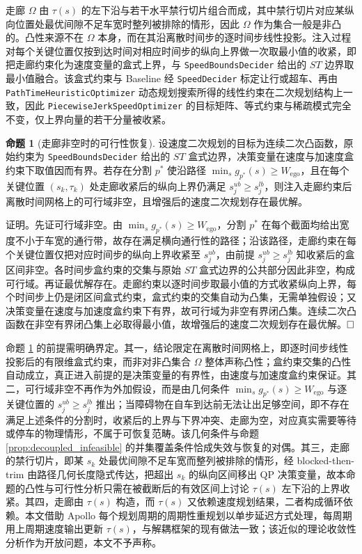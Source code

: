 \documentclass[a4paper,11pt]{ctexart}
\theoremstyle{definition}
\newtheorem{proposition}{命题}[section]
\begin{document}
走廊 $\Omega$ 由 $\tau(s)$ 的左下沿与若干水平禁行切片组合而成，其中禁行切片对应某纵向位置处最优间隙不足车宽时整列被排除的情形，因此 $\Omega$ 作为集合一般是非凸的。凸性来源不在 $\Omega$ 本身，而在其沿离散时间步的逐时间步线性投影。注入过程对每个关键位置仅按到达时间对相应时间步的纵向上界做一次取最小值的收紧，即把走廊约束化为速度变量的盒式上界，与 \texttt{SpeedBoundsDecider} 给出的 $ST$ 边界取最小值融合。该盒式约束与 Baseline 经 \texttt{SpeedDecider} 标定让行或超车、再由 \texttt{PathTimeHeuristicOptimizer} 动态规划搜索所得的线性约束在二次规划结构上一致，因此 \texttt{PiecewiseJerkSpeedOptimizer} 的目标矩阵、等式约束与稀疏模式完全不变，仅上界向量的若干分量被收紧。

\begin{proposition}[走廊非空时的可行性恢复]
\label{prop:feasibility_recovery}
设速度二次规划的目标为连续二次凸函数，原始约束为 \texttt{SpeedBoundsDecider} 给出的 $ST$ 盒式边界，决策变量在速度与加速度盒约束下取值因而有界。若存在分割 $p^{*}$ 使沿路径 $\min_s g_{p^{*}}(s) \geq W_{\text{ego}}$，且在每个关键位置 $(s_k, \tau_k)$ 处走廊收紧后的纵向上界仍满足 $s_j^{ub} \geq s_j^{lb}$，则注入走廊约束后离散时间网格上的可行域非空，且增强后的速度二次规划存在最优解。
\end{proposition}

证明。先证可行域非空。由 $\min_s g_{p^{*}}(s) \geq W_{\text{ego}}$，分割 $p^{*}$ 在每个截面均给出宽度不小于车宽的通行带，故存在满足横向通行性的路径；沿该路径，走廊约束在每个关键位置仅把对应时间步的纵向上界收紧至 $s_j^{ub}$，由前提 $s_j^{ub} \geq s_j^{lb}$ 知收紧后的盒区间非空。各时间步盒约束的交集与原始 $ST$ 盒式边界的公共部分因此非空，构成可行域。再证最优解存在。走廊约束以逐时间步取最小值的方式收紧纵向上界，每个时间步上仍是闭区间盒式约束，盒式约束的交集自动为凸集，无需单独假设；又决策变量在速度与加速度盒约束下有界，故可行域为非空有界闭凸集。连续二次凸函数在非空有界闭凸集上必取得最小值，故增强后的速度二次规划存在最优解。$\hfill\Box$

命题 \ref{prop:feasibility_recovery} 的前提需明确界定。其一，结论限定在离散时间网格上，即逐时间步线性投影后的有限维盒式约束，而非对非凸集合 $\Omega$ 整体声称凸性；盒约束交集的凸性自动成立，真正进入前提的是决策变量的有界性，由速度与加速度盒约束保证。其二，可行域非空不再作为外加假设，而是由几何条件 $\min_s g_{p^{*}}(s) \geq W_{\text{ego}}$ 与逐关键位置的 $s_j^{ub} \geq s_j^{lb}$ 推出；当障碍物在自车到达前无法让出足够空间，即不存在满足上述条件的分割时，收紧后的上界与下界冲突、走廊为空，对应真实需要等待或停车的物理情形，不属于可恢复范畴。该几何条件与命题 \ref{prop:decoupled_infeasible} 的并集覆盖条件恰成失效与恢复的对偶。其三，走廊的禁行切片，即某 $s_k$ 处最优间隙不足车宽而整列被排除的情形，经 blocked-then-trim 由路径几何长度隐式传达，把超出 $s_k$ 的纵向区间移出 QP 决策变量，故本命题的凸性与可行性分析只需在被截断后的有效区间上讨论 $\tau(s)$ 左下沿的上界收紧。其四，走廊由 $\tau(s)$ 构造，而 $\tau(s)$ 又依赖速度规划结果，二者构成循环依赖。本文借助 Apollo 每个规划周期的周期性重规划以单步延迟方式处理，每周期用上周期速度输出更新 $\tau(s)$，与解耦框架的现有做法一致；该近似的理论收敛性分析作为开放问题，本文不予声称。
\end{document}
